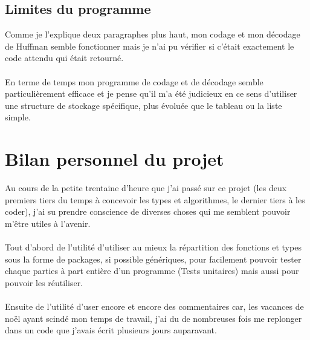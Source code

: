 \documentclass{book}
\begin{document}
\subsection{Limites du programme}
Comme je l'explique deux paragraphes plus haut, mon codage et mon décodage de Huffman semble fonctionner mais je n'ai pu vérifier si c'était exactement le code attendu qui était retourné.
\paragraph{}
En terme de temps mon programme de codage et de décodage semble particulièrement efficace et je pense qu'il m'a été judicieux en ce sens d'utiliser une structure de stockage spécifique, plus évoluée que le tableau ou la liste simple.

\section{Bilan personnel du projet}
Au cours de la petite trentaine d'heure que j'ai passé sur ce projet (les deux premiers tiers du temps à concevoir les types et algorithmes, le dernier tiers à les coder), j'ai su prendre conscience de diverses choses qui me semblent pouvoir m'être utiles à l'avenir.
\paragraph{}
Tout d'abord de l'utilité d'utiliser au mieux la répartition des fonctions et types sous la forme de packages, si possible génériques, pour facilement pouvoir tester chaque parties à part entière d'un programme (Tests unitaires) mais aussi pour pouvoir les réutiliser.
\paragraph{}
Ensuite de l'utilité d'user encore et encore des commentaires car, les vacances de no\"{e}l ayant scindé mon temps de travail, j'ai du de nombreuses fois me replonger dans un code que j'avais écrit plusieurs jours auparavant.
\end{document}
